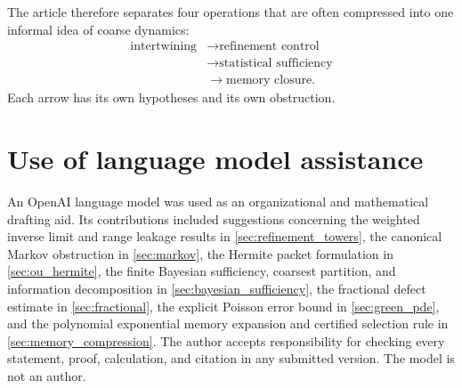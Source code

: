 \documentclass{aomart}
\theoremstyle{definition}
\theoremstyle{remark}
\begin{document}
The article therefore separates four operations that are often compressed into one informal idea of coarse dynamics:
\[
\begin{aligned}
\text{intertwining}
&\longrightarrow
\text{refinement control}\\
&\longrightarrow
\text{statistical sufficiency}\\
&\longrightarrow
\text{memory closure}.
\end{aligned}
\]
Each arrow has its own hypotheses and its own obstruction.

\section*{Use of language model assistance}
An OpenAI language model was used as an organizational and mathematical drafting aid. Its contributions included suggestions concerning the weighted inverse limit and range leakage results in \cref{sec:refinement_towers}, the canonical Markov obstruction in \cref{sec:markov}, the Hermite packet formulation in \cref{sec:ou_hermite}, the finite Bayesian sufficiency, coarsest partition, and information decomposition in \cref{sec:bayesian_sufficiency}, the fractional defect estimate in \cref{sec:fractional}, the explicit Poisson error bound in \cref{sec:green_pde}, and the polynomial exponential memory expansion and certified selection rule in \cref{sec:memory_compression}. The author accepts responsibility for checking every statement, proof, calculation, and citation in any submitted version. The model is not an author.



\end{document}
